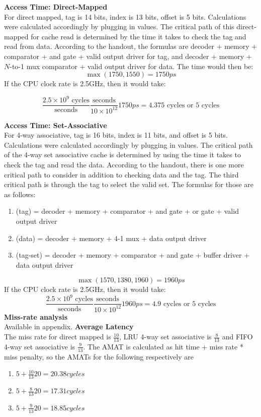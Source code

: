 \documentclass[11pt]{article}
\begin{document}
\begin{Parts}
	\Part \textbf{Access Time: Direct-Mapped} \\
		For direct mapped, tag is 14 bits, index is 13 bits, offset is 5 bits. Calculations were calculated accordingly by plugging in values. The critical path of this direct-mapped for cache read is determined by the time it takes to check the tag and read from data. 
		According to the handout, the formulas are decoder + memory + comparator + and gate + valid output driver for tag, and decoder + memory + $N$-to-1 mux comparator + valid output driver for data. The time would then be:
		$$\max(1750, 1550) = 1750ps$$
	If the CPU clock rate is 2.5GHz, then it would take:
	
	$$\frac{2.5 \times 10^9 \text{ cycles}}{\text{seconds}}\frac{\text{seconds}}{10 \times 10^{12}} 1750ps = 4.375 \text{ cycles or } 5 \text{ cycles}$$
	
	\Part \textbf{Access Time: Set-Associative} \\
	 For 4-way associative, tag is 16 bits, index is 11 bits, and offset is 5 bits. Calculations were calculated accordingly by plugging in values. The critical path of the 4-way set associative cache is determined by using the time it takes to check the tag and read the data.
	 According to the handout, there is one more critical path to consider in addition to checking data and the tag. The third critical path is through the tag to select the valid set. The formulas for those are as follows:
	 \begin{enumerate}
	 	\item (tag) = decoder + memory + comparator + and gate + or gate + valid output driver
		\item (data) = decoder + memory + 4-1 mux + data output driver
		\item (tag-set) = decoder + memory + comparator + and gate + buffer driver + data output driver
	 \end{enumerate}
	 $$\max(1570, 1380, 1960) = 1960ps$$
	 If the CPU clock rate is 2.5GHz, then it would take:
	 $$\frac{2.5 \times 10^9 \text{ cycles}}{\text{seconds}}\frac{\text{seconds}}{10 \times 10^{12}} 1960ps = 4.9 \text{ cycles or } 5 \text{ cycles}$$
	\Part \textbf{Miss-rate analysis} \\
		Available in appendix.
	\Part \textbf{Average Latency} \\
		The miss rate for direct mapped is $\frac{10}{13}$, LRU 4-way set associative is $\frac{8}{13}$ and FIFO 4-way set associative is $\frac{9}{13}$. The AMAT is calculated as hit time + miss rate * miss penalty, so the AMATs for the following respectively are 
	\begin{enumerate}
		\item $5 + \frac{10}{13}20 = 20.38 cycles$
		\item $5 + \frac{8}{13}20 = 17.31 cycles$
		\item $5 + \frac{9}{13}20 = 18.85 cycles$
	\end{enumerate}
	

\end{Parts}
\end{document}
